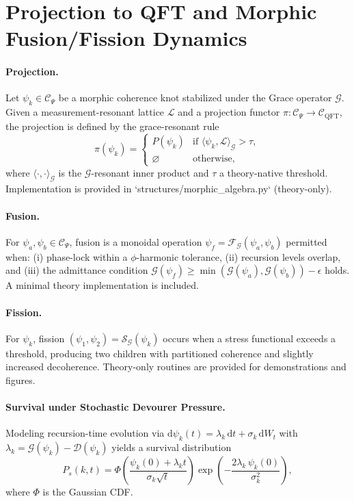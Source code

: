 \section{Projection to QFT and Morphic Fusion/Fission Dynamics}
\label{sec:morphic_projection}

\paragraph{Projection.} Let $\psi_k\in\mathcal C_\Psi$ be a morphic coherence knot
stabilized under the Grace operator $\mathcal G$. Given a measurement-resonant
lattice $\mathcal L$ and a projection functor $\pi: \mathcal C_\Psi\to\mathcal C_{\mathrm{QFT}}$,
the projection is defined by the grace-resonant rule
\[\pi(\psi_k) = \begin{cases}
P(\psi_k) & \text{if } \langle \psi_k, \mathcal L \rangle_{\mathcal G} > \tau,\\
\varnothing & \text{otherwise,}\end{cases}\]
where $\langle\cdot,\cdot\rangle_{\mathcal G}$ is the $\mathcal G$-resonant inner
product and $\tau$ a theory-native threshold. Implementation is provided in
`structures/morphic_algebra.py` (theory-only).

\paragraph{Fusion.} For $\psi_a,\psi_b\in\mathcal C_\Psi$, fusion is a monoidal
operation $\psi_f=\mathcal F_{\mathcal G}(\psi_a,\psi_b)$ permitted when: (i) phase-lock
within a $\phi$-harmonic tolerance, (ii) recursion levels overlap, and (iii) the
admittance condition $\mathcal G(\psi_f)\ge\min(\mathcal G(\psi_a),\mathcal G(\psi_b)) - \epsilon$
holds. A minimal theory implementation is included.

\paragraph{Fission.} For $\psi_k$, fission $(\psi_1,\psi_2)=\mathcal S_{\mathcal G}(\psi_k)$
occurs when a stress functional exceeds a threshold, producing two children with
partitioned coherence and slightly increased decoherence. Theory-only routines
are provided for demonstrations and figures.

\paragraph{Survival under Stochastic Devourer Pressure.} Modeling recursion-time
evolution via $\mathrm d\psi_k(t) = \lambda_k\,\mathrm dt + \sigma_k\,\mathrm dW_t$ with
$\lambda_k = \mathcal G(\psi_k) - \mathcal D(\psi_k)$ yields a survival distribution
\[P_s(k,t)=\Phi\!\left(\frac{\psi_k(0)+\lambda_k t}{\sigma_k\sqrt t}\right)
\exp\!\left(-\frac{2\lambda_k\,\psi_k(0)}{\sigma_k^2}\right),\]
where $\Phi$ is the Gaussian CDF.

